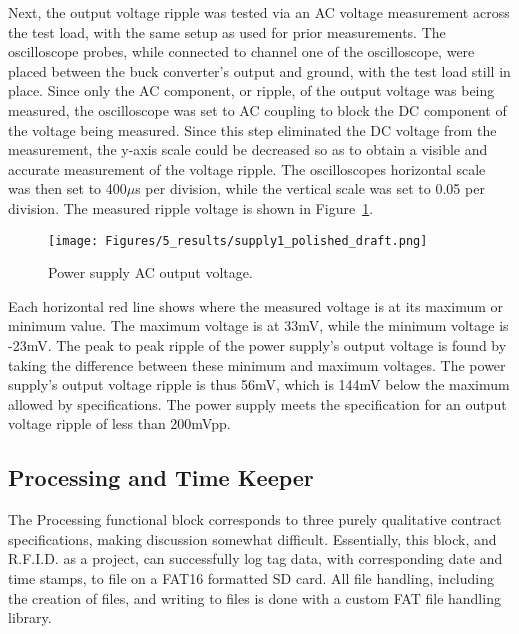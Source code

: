 
Next, the output voltage ripple was tested via an AC voltage measurement across the test load, with the same setup as used for prior measurements. The oscilloscope probes, while connected to channel one of the oscilloscope, were placed between the buck converter's output and ground, with the test load still in place. Since only the AC component, or ripple, of the output voltage was being measured, the oscilloscope was set to AC coupling to block the DC component of the voltage being measured. Since this step eliminated the DC voltage from the measurement, the y-axis scale could be decreased so as to obtain a visible and accurate measurement of the voltage ripple. The oscilloscopes horizontal scale was then set to 400$\mu$s per division, while the vertical scale was set to 0.05 per division. The measured ripple voltage is shown in Figure~\ref{fig:voltage_ripple}.

\begin{figure}[H]
    \centering
    \texttt{[image: Figures/5\_results/supply1\_polished\_draft.png]} 
    \caption{Power supply AC output voltage.}
    \label{fig:voltage_ripple}
\end{figure}

Each horizontal red line shows where the measured voltage is at its maximum or minimum value. The maximum voltage is at 33mV, while the minimum voltage is -23mV. The peak to peak ripple of the power supply's output voltage is found by taking the difference between these minimum and maximum voltages. The power supply's output voltage ripple is thus 56mV, which is 144mV below the maximum allowed by specifications. The power supply meets the specification for an output voltage ripple of less than 200mVpp.


\subsection{Processing and Time Keeper}

The Processing functional block corresponds to three purely qualitative contract specifications, making discussion somewhat difficult. Essentially, this block, and R.F.I.D. as a project, can successfully log tag data, with corresponding date and time stamps, to file on a FAT16 formatted SD card. All file handling, including the creation of files, and writing to files is done with a custom FAT file handling library.

